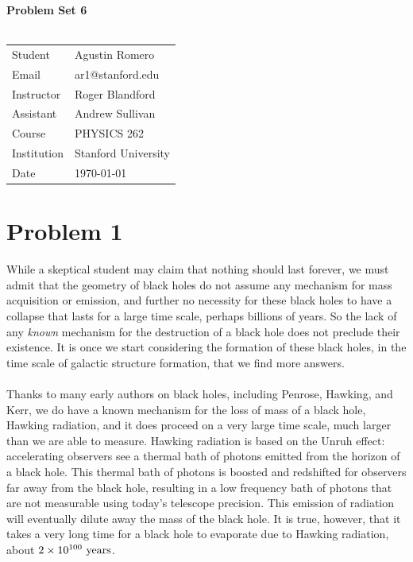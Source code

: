 \documentclass{article}
\begin{document}
\begin{center}
\textbf{\Large{Problem Set 6}}\\~\\
\begin{tabular}{l l}
Student&Agustin Romero\\
Email&ar1@stanford.edu\\
Instructor&Roger Blandford\\
Assistant&Andrew Sullivan\\
Course&PHYSICS 262\\
Institution&Stanford University\\
Date&\today\\
\end{tabular}
\end{center}
\section*{Problem 1}
While a skeptical student may claim that nothing should last forever, we must admit that the geometry of black holes do not assume any mechanism for mass acquisition or emission, and further no necessity for these black holes to have a collapse that lasts for a large time scale, perhaps billions of years. So the lack of any \textit{known} mechanism for the destruction of a black hole does not preclude their existence. It is once we start considering the formation of these black holes, in the time scale of galactic structure formation, that we find more answers.\\~\\
Thanks to many early authors on black holes, including Penrose, Hawking, and Kerr, we do have a known mechanism for the loss of mass of a black hole, Hawking radiation, and it does proceed on a very large time scale, much larger than we are able to measure. Hawking radiation is based on the Unruh effect: accelerating observers see a thermal bath of photons emitted from the horizon of a black hole. This thermal bath of photons is boosted and redshifted for observers far away from the black hole, resulting in a low frequency bath of photons that are not measurable using today's telescope precision. This emission of radiation will eventually dilute away the mass of the black hole. It is true, however, that it takes a very long time for a black hole to evaporate due to Hawking radiation, about $2\times 10^{100}\textrm{ years}$.
\end{document}
